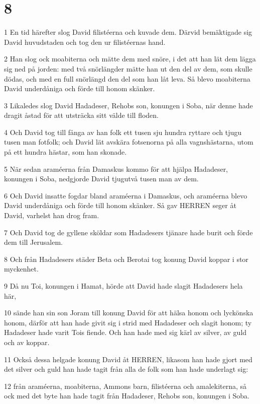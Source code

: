 \chapter{8}

\par 1 En tid härefter slog David filistéerna och kuvade dem. Därvid bemäktigade sig David huvudstaden och tog den ur filistéernas hand.
\par 2 Han slog ock moabiterna och mätte dem med snöre, i det att han lät dem lägga sig ned på jorden: med två snörlängder mätte han ut den del av dem, som skulle dödas, och med en full snörlängd den del som han låt leva. Så blevo moabiterna David underdåniga och förde till honom skänker.
\par 3 Likaledes slog David Hadadeser, Rehobs son, konungen i Soba, när denne hade dragit åstad för att utsträcka sitt välde till floden.
\par 4 Och David tog till fånga av han folk ett tusen sju hundra ryttare och tjugu tusen man fotfolk; och David lät avskära fotsenorna på alla vagnshästarna, utom på ett hundra hästar, som han skonade.
\par 5 När sedan araméerna från Damaskus kommo för att hjälpa Hadadeser, konungen i Soba, nedgjorde David tjugutvå tusen man av dem.
\par 6 Och David insatte fogdar bland araméerna i Damaskus, och araméerna blevo David underdåniga och förde till honom skänker. Så gav HERREN seger åt David, varhelst han drog fram.
\par 7 Och David tog de gyllene sköldar som Hadadesers tjänare hade burit och förde dem till Jerusalem.
\par 8 Och från Hadadesers städer Beta och Berotai tog konung David koppar i stor myckenhet.
\par 9 Då nu Toi, konungen i Hamat, hörde att David hade slagit Hadadesers hela här,
\par 10 sände han sin son Joram till konung David för att hälsa honom och lyckönska honom, därför att han hade givit sig i strid med Hadadeser och slagit honom; ty Hadadeser hade varit Tois fiende. Och han hade med sig kärl av silver, av guld och av koppar.
\par 11 Också dessa helgade konung David åt HERREN, likasom han hade gjort med det silver och guld han hade tagit från alla de folk som han hade underlagt sig:
\par 12 från araméerna, moabiterna, Ammons barn, filistéerna och amalekiterna, så ock med det byte han hade tagit från Hadadeser, Rehobs son, konungen i Soba.
